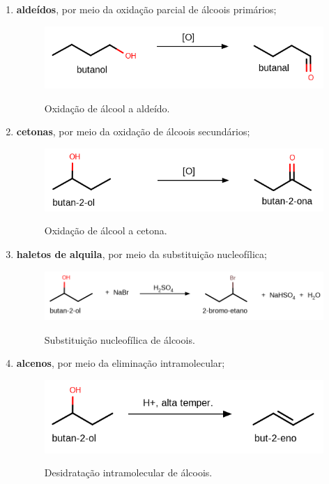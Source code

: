 \begin{enumerate}
    \item \textbf{aldeídos}, por meio da oxidação parcial de álcoois primários;
    \begin{figure}[h]
        \centering
        \caption{Oxidação de álcool a aldeído.}
        \vspace{0.5cm}
        \includegraphics[width=0.75\linewidth]{imagens/alcool-aldeido.png}
    \label{fig:alcoolaldeido}
    \end{figure}

    \item \textbf{cetonas}, por meio da oxidação de álcoois secundários;
    \begin{figure}[h]
        \centering
        \caption{Oxidação de álcool a cetona.}
        \vspace{0.5cm}
        \includegraphics[width=0.75\linewidth]{imagens/alcoolcetona.png}
    \label{fig:alcoolcetona}
    \end{figure}

    \item \textbf{haletos de alquila}, por meio da substituição nucleofílica;
    \begin{figure}[h]
        \centering
        \caption{Substituição nucleofílica de álcoois.}
        \vspace{0.5cm}
        \includegraphics[width=1\linewidth]{imagens/alcoolhaleto.png}
    \label{fig:alcoolhaleto}
    \end{figure}

    \item \textbf{alcenos}, por meio da eliminação intramolecular;
    \begin{figure}[h]
        \centering
        \caption{Desidratação intramolecular de álcoois.}
        \vspace{0.5cm}
        \includegraphics[width=0.85\linewidth]{imagens/alcoolalceno.png}
    \label{fig:alcoolalceno}
    \end{figure}


\end{enumerate}
